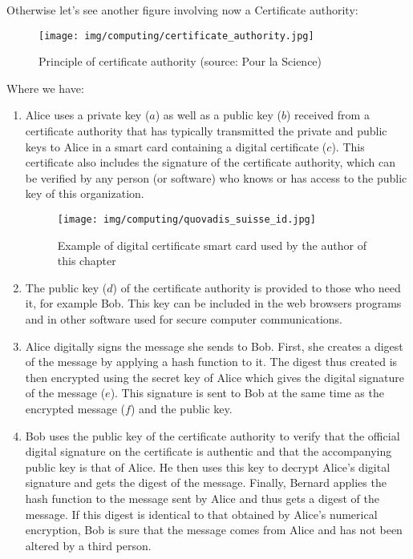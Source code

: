 	Otherwise let's see another figure involving now a Certificate authority:
	\begin{figure}[H]
		\centering
		\texttt{[image: img/computing/certificate\_authority.jpg]}
		\caption{Principle of certificate authority (source: Pour la Science)}
	\end{figure}
	Where we have:
	\begin{enumerate}
		\item Alice uses a private key ($a$) as well as a public key ($b$) received from a certificate authority that has typically transmitted the private and public keys to Alice in a smart card containing a digital certificate ($c$). This certificate also includes the signature of the certificate authority, which can be verified by any person (or software) who knows or has access to the public key of this organization.
		\begin{figure}[H]
		\centering
		\texttt{[image: img/computing/quovadis\_suisse\_id.jpg]}
		\caption[]{Example of digital certificate smart card used by the author of this chapter}
	\end{figure}
		
		\item The public key ($d$) of the certificate authority is provided to those who need it, for example Bob. This key can be included in the web browsers programs and in other software used for secure computer communications.
		
		\item Alice digitally signs the message she sends to Bob. First, she creates a digest of the message by applying a hash function to it. The digest thus created is then encrypted using the secret key of Alice which gives the digital signature of the message ($e$). This signature is sent to Bob at the same time as the encrypted message ($f$) and the public key.
		
		\item Bob uses the public key of the certificate authority to verify that the official digital signature on the certificate is authentic and that the accompanying public key is that of Alice. He then uses this key to decrypt Alice's digital signature and gets the digest of the message. Finally, Bernard applies the hash function to the message sent by Alice and thus gets a digest of the message. If this digest is identical to that obtained by Alice's numerical encryption, Bob is sure that the message comes from Alice and has not been altered by a third person.
	\end{enumerate}
	
